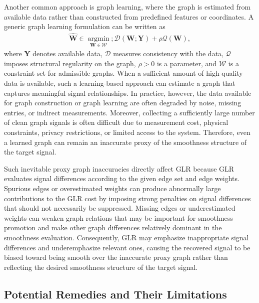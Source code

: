 Another common approach is graph learning, where the graph is estimated from available data rather than constructed from predefined features or coordinates. A generic graph learning formulation can be written as
\begin{equation}
\begin{aligned}
\widehat{\mathbf{W}}
\in
\operatorname*{argmin}_{\mathbf{W}\in\mathcal{W}};
\mathcal{D}(\mathbf{W};\mathbf{Y})
+
\rho\mathcal{Q}(\mathbf{W}),
\end{aligned}
\label{eq:graph_learning_example}
\end{equation}
where $\mathbf{Y}$ denotes available data, $\mathcal{D}$ measures consistency with the data, $\mathcal{Q}$ imposes structural regularity on the graph, $\rho>0$ is a parameter, and $\mathcal{W}$ is a constraint set for admissible graphs. When a sufficient amount of high-quality data is available, such a learning-based approach can estimate a graph that captures meaningful signal relationships. In practice, however, the data available for graph construction or graph learning are often degraded by noise, missing entries, or indirect measurements. Moreover, collecting a sufficiently large number of clean graph signals is often difficult due to measurement cost, physical constraints, privacy restrictions, or limited access to the system. Therefore, even a learned graph can remain an inaccurate proxy of the smoothness structure of the target signal.

Such inevitable proxy graph inaccuracies directly affect GLR because GLR evaluates signal differences according to the given edge set and edge weights. Spurious edges or overestimated weights can produce abnormally large contributions to the GLR cost by imposing strong penalties on signal differences that should not necessarily be suppressed. Missing edges or underestimated weights can weaken graph relations that may be important for smoothness promotion and make other graph differences relatively dominant in the smoothness evaluation. Consequently, GLR may emphasize inappropriate signal differences and underemphasize relevant ones, causing the recovered signal to be biased toward being smooth over the inaccurate proxy graph rather than reflecting the desired smoothness structure of the target signal.

\subsection{Potential Remedies and Their Limitations}
\label{subsec:potential_remedies}

